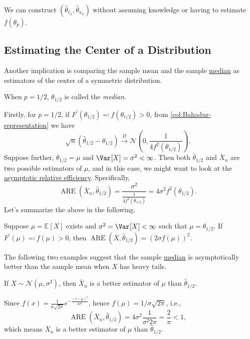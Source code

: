 \begin{remark}
	We can construct \((\hat{\theta} _{\ell _n}, \hat{\theta} _{u_n})\) without assuming knowledge or having to estimate \(f(\theta _p)\).
\end{remark}

\subsection{Estimating the Center of a Distribution}
Another implication is comparing the sample mean and the sample \hyperref[def:median]{median} as estimators of the center of a symmetric distribution.

\begin{definition}[Median]\label{def:median}
	When \(p = 1 / 2\), \(\theta _{1 / 2}\) is called the \emph{median}.
\end{definition}

Firstly, for \(p = 1 / 2\), if \(F^{\prime} (\theta _{1 / 2}) \eqqcolon f(\theta _{1 / 2}) > 0\), from \autoref{col:Bahadur-representation} we have
\[
	\sqrt{n} (\hat{\theta} _{1 / 2} - \theta _{1 / 2})
	\overset{D}{\to} \mathcal{N} \left( 0, \frac{1}{4 f^2(\theta _{1 / 2})} \right) .
\]
Suppose further, \(\theta _{1 / 2} = \mu \) and \(\Var_{}[X] = \sigma ^2 < \infty \). Then both \(\hat{\theta} _{1 / 2}\) and \(\overline{X} _n\) are two possible estimators of \(\mu \), and in this case, we might want to look at the \hyperref[def:asymptotic-relative-efficiency-estimator]{asymptotic relative efficiency}. Specifically,
\[
	\operatorname{ARE}(\overline{X} _n , \hat{\theta} _{1 / 2})
	= \frac{\sigma ^2}{\frac{1}{4 f^2(\theta _{1 / 2})}}
	= 4 \sigma ^2 f^2(\theta _{1 / 2}).
\]
Let's summarize the above in the following.

\begin{proposition}\label{prop:sample-quantile-ARE}
	Suppose \(\mu = \mathbb{E}_{}[X] \) exists and \(\sigma ^2 = \Var_{}[X] < \infty \) such that \(\mu = \theta _{1 / 2}\). If \(F^{\prime} (\mu ) \eqqcolon f(\mu ) > 0\), then \(\operatorname{ARE}(\overline{X} , \hat{\theta} _{1 / 2}) = (2 \sigma f(\mu ))^2\).
\end{proposition}

The following two examples suggest that the sample \hyperref[def:median]{median} is asymptotically better than the sample mean when \(X\) has heavy tails.

\begin{eg}\label{eg:ARE-normal}
	If \(X \sim \mathcal{N} (\mu , \sigma ^2)\), then \(\overline{X} _n\) is a better estimator of \(\mu \) than \(\hat{\theta} _{1 / 2}\).
\end{eg}
\begin{explanation}
	Since \(f(x) = \frac{1}{\sigma \sqrt{2\pi } } e^{- \frac{(x - \mu )^2}{2 \sigma ^2}}\), hence \(f(\mu ) = 1 / \sigma \sqrt{2\pi } \), i.e.,
	\[
		\operatorname{ARE}(\overline{X} _n, \hat{\theta} _{1 / 2})
		= 4 \sigma ^2 \frac{1}{\sigma ^2 2\pi }
		= \frac{2}{\pi }
		< 1,
	\]
	which means \(\overline{X} _n\) is a better estimator of \(\mu \) than \(\hat{\theta} _{1 / 2}\).
\end{explanation}

